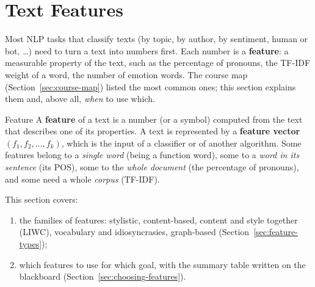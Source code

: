 \section{Text Features}
\label{sec:text-features}

Most NLP tasks that classify texts (by topic, by author, by sentiment, human or bot,
\ldots) need to turn a text into numbers first. Each number is a \textbf{feature}: a
measurable property of the text, such as the percentage of pronouns, the TF-IDF weight
of a word, the number of emotion words. The course map
(Section~\ref{sec:course-map}) listed the most common ones; this section explains them
and, above all, \emph{when} to use which.

\begin{nbdef}{Feature}
A \textbf{feature} of a text is a number (or a symbol) computed from the text that
describes one of its properties. A text is represented by a \textbf{feature vector}
$(f_1, f_2, \ldots, f_k)$, which is the input of a classifier or of another algorithm.
Some features belong to a \emph{single word} (being a function word), some to a
\emph{word in its sentence} (its POS), some to the \emph{whole document} (the
percentage of pronouns), and some need a whole \emph{corpus} (TF-IDF).
\end{nbdef}

This section covers:
\begin{enumerate}[nosep]
  \item the families of features: stylistic, content-based, content and style
        together (LIWC), vocabulary and idiosyncrasies, graph-based
        (Section~\ref{sec:feature-types});
  \item which features to use for which goal, with the summary table written on the
        blackboard (Section~\ref{sec:choosing-features}).
\end{enumerate}



